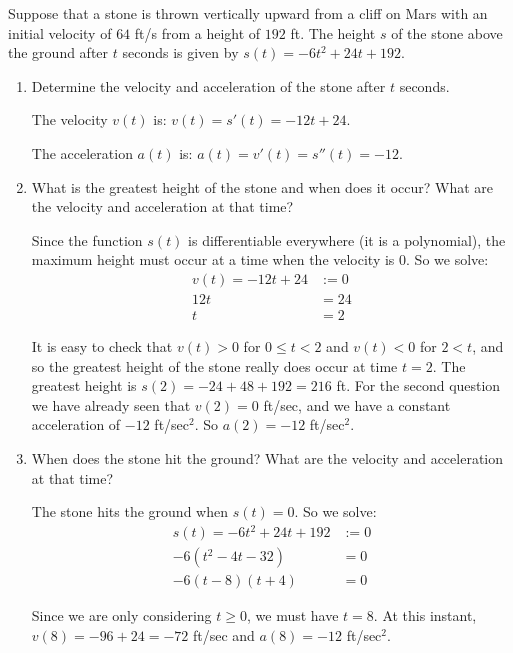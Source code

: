 \documentclass[nooutcomes]{ximera}
\begin{document}
\begin{problem}
Suppose that a stone is thrown vertically upward from a cliff on Mars with an initial velocity of $64$ ft/s from a height of $192$ ft.  The height $s$ of the stone above the ground after $t$ seconds is given by $s(t) = -6t^2 + 24t + 192$.

	\begin{enumerate}
	
	\item  Determine the velocity and acceleration of the stone after $t$ seconds.
			\begin{freeResponse}
			The velocity $v(t)$ is:  $v(t) = s'(t) = -12t + 24$.
			
			The acceleration $a(t)$ is:  $a(t) = v'(t) = s''(t) = -12$.
			\end{freeResponse}
			
			
			
	\item  What is the greatest height of the stone and when does it occur?  What are the velocity and acceleration at that time?
			\begin{freeResponse}
			Since the function $s(t)$ is differentiable everywhere (it is a polynomial), the maximum height must occur at a time when the velocity is $0$.  So we solve:
			\begin{align*}
			v(t) = -12t+24 &:= 0 \\
			12t &= 24 \\
			t &= 2
			\end{align*}
			
			It is easy to check that $v(t) > 0$ for $0 \leq t < 2$ and $v(t) < 0$ for $2 < t$, and so the greatest height of the stone really does occur at time $t=2$.  The greatest height is $s(2) = -24 + 48 + 192 = 216$ ft.  For the second question we have already seen that $v(2) = 0$ ft/sec, and we have a constant acceleration of $-12$ ft/sec$^2$.  So $a(2) = -12$ ft/sec$^2$.
			\end{freeResponse}
			
			
			
	\item  When does the stone hit the ground?  What are the velocity and acceleration at that time?
			\begin{freeResponse}
			The stone hits the ground when $s(t) = 0$.  So we solve:
			\begin{align*}
			s(t) = -6t^2 + 24t + 192 &:= 0 \\
			-6(t^2 - 4t - 32) &= 0 \\
			-6(t-8)(t+4) &= 0 
			\end{align*}
			
			Since we are only considering $t \geq 0$, we must have $t=8$.  At this instant, $v(8) = -96 + 24 = -72$ ft/sec and $a(8) = -12$ ft/sec$^2$.  
			
			\end{freeResponse}
			
			
			
	\end{enumerate}
			
			
			
		
\end{problem}
\end{document}
